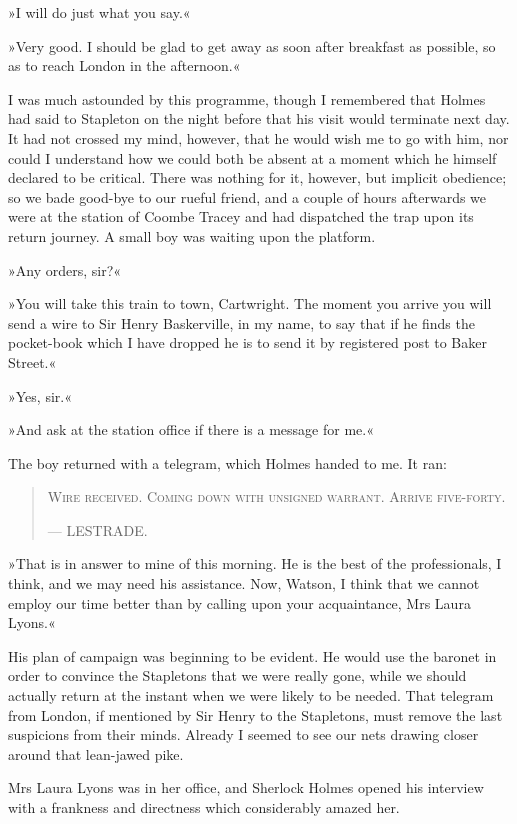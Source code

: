 »I will do just what you say.«

»Very good. I should be glad to get away as soon after breakfast as possible, so as to reach London in the afternoon.«

I was much astounded by this programme, though I re\-mem\-bered that Holmes had said to Stapleton on the night before that his visit would terminate next day. It had not crossed my mind, however, that he would wish me to go with him, nor could I understand how we could both be absent at a moment which he himself declared to be critical. There was nothing for it, however, but implicit obedience; so we bade good-bye to our rueful friend, and a couple of hours afterwards we were at the station of Coombe Tracey and had dispatched the trap upon its return journey. A small boy was waiting upon the platform.

»Any orders, sir?«

»You will take this train to town, Cartwright. The moment you arrive you will send a wire to Sir Henry Baskerville, in my name, to say that if he finds the pocket-book which I have dropped he is to send it by registered post to Baker Street.«

»Yes, sir.«

»And ask at the station office if there is a message for me.«

The boy returned with a telegram, which Holmes handed to me. It ran: 
\begin{samepage}
\blockquote{
\textsc{Wire received. Coming down with unsigned warrant. Arrive five-forty.}
\begin{flushright}
—  {\small\scshape LESTRADE.}
\end{flushright}
}
\end{samepage}

»That is in answer to mine of this morning. He is the best of the professionals, I think, and we may need his assistance. Now, Watson, I think that we cannot employ our time better than by calling upon your acquaintance, Mrs Laura Lyons.«

His plan of campaign was beginning to be evident. He would use the baronet in order to convince the Stapletons that we were really gone, while we should actually return at the instant when we were likely to be needed. That telegram from London, if mentioned by Sir Henry to the Stapletons, must remove the last suspicions from their minds. Already I seemed to see our nets drawing closer around that lean-jawed pike.

Mrs Laura Lyons was in her office, and Sherlock Holmes opened his interview with a frankness and directness which considerably amazed her.

